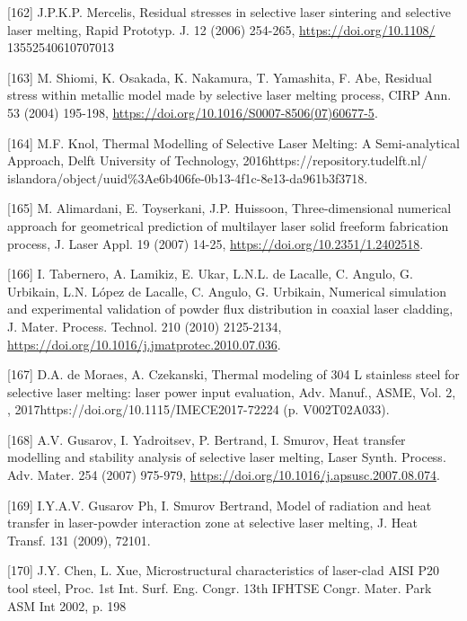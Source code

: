 \documentclass[10pt]{article}
\begin{document}
[162] J.P.K.P. Mercelis, Residual stresses in selective laser sintering and selective laser melting, Rapid Prototyp. J. 12 (2006) 254-265, \href{https://doi.org/10.1108/}{https://doi.org/10.1108/} 13552540610707013

[163] M. Shiomi, K. Osakada, K. Nakamura, T. Yamashita, F. Abe, Residual stress within metallic model made by selective laser melting process, CIRP Ann. 53 (2004) 195-198, \href{https://doi.org/10.1016/S0007-8506(07)60677-5}{https://doi.org/10.1016/S0007-8506(07)60677-5}.

[164] M.F. Knol, Thermal Modelling of Selective Laser Melting: A Semi-analytical Approach, Delft University of Technology, 2016https://repository.tudelft.nl/ islandora/object/uuid\%3Ae6b406fe-0b13-4f1c-8e13-da961b3f3718.

[165] M. Alimardani, E. Toyserkani, J.P. Huissoon, Three-dimensional numerical approach for geometrical prediction of multilayer laser solid freeform fabrication process, J. Laser Appl. 19 (2007) 14-25, \href{https://doi.org/10.2351/1.2402518}{https://doi.org/10.2351/1.2402518}.

[166] I. Tabernero, A. Lamikiz, E. Ukar, L.N.L. de Lacalle, C. Angulo, G. Urbikain, L.N. López de Lacalle, C. Angulo, G. Urbikain, Numerical simulation and experimental validation of powder flux distribution in coaxial laser cladding, J. Mater. Process. Technol. 210 (2010) 2125-2134, \href{https://doi.org/10.1016/j.jmatprotec.2010.07.036}{https://doi.org/10.1016/j.jmatprotec.2010.07.036}.

[167] D.A. de Moraes, A. Czekanski, Thermal modeling of 304 L stainless steel for selective laser melting: laser power input evaluation, Adv. Manuf., ASME, Vol. 2, , 2017https://doi.org/10.1115/IMECE2017-72224 (p. V002T02A033).

[168] A.V. Gusarov, I. Yadroitsev, P. Bertrand, I. Smurov, Heat transfer modelling and stability analysis of selective laser melting, Laser Synth. Process. Adv. Mater. 254 (2007) 975-979, \href{https://doi.org/10.1016/j.apsusc.2007.08.074}{https://doi.org/10.1016/j.apsusc.2007.08.074}.

[169] I.Y.A.V. Gusarov Ph, I. Smurov Bertrand, Model of radiation and heat transfer in laser-powder interaction zone at selective laser melting, J. Heat Transf. 131 (2009), 72101.

[170] J.Y. Chen, L. Xue, Microstructural characteristics of laser-clad AISI P20 tool steel, Proc. 1st Int. Surf. Eng. Congr. 13th IFHTSE Congr. Mater. Park ASM Int 2002, p. 198
\end{document}
